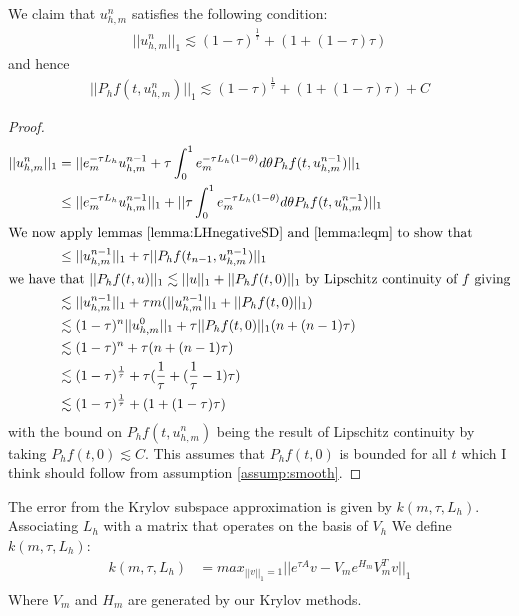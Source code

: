 \begin{lemma}
    We claim that $u_{h,m}^n$ satisfies the following condition:
    \begin{align*}
        ||u_{h,m}^n||_1 \lesssim (1-\tau)^\frac{1}{\tau} + (1 + (1 - \tau)\tau)
    \end{align*}
    and hence
    \begin{align*}
        ||P_hf(t,u_{h,m}^n)||_1 \lesssim (1-\tau)^\frac{1}{\tau} + (1 + (1 - \tau)\tau ) + C
    \end{align*}
\end{lemma}
\begin{proof}
    \begin{align*}
        ||u_{h,m}^n||_1 &= ||e_m^{-\tau L_h}u_{h,m}^{n-1} + \tau \int^1_0e_m^{-\tau L_h(1-\theta)}d\theta P_hf(t, u_{h,m}^{n-1})||_1\\
        &\leq ||e_m^{-\tau L_h}u_{h,m}^{n-1}||_1 + ||\tau \int^1_0e_m^{-\tau L_h(1-\theta)}d\theta P_hf(t, u_{h,m}^{n-1})||_1\\
        \intertext{We now apply lemmas \ref{lemma:LHnegativeSD} and \ref{lemma:leqm} to show that}
        &\leq ||u_{h,m}^{n-1}||_1 + \tau ||P_hf(t_{n-1},u_{h,m}^{n-1})||_1\\
        \intertext{we have that $||P_hf(t,u)||_1 \lesssim ||u||_1+||P_hf(t,0)||_1$ by Lipschitz continuity of $f$ giving}
        &\lesssim ||u_{h,m}^{n-1}||_1 + \tau m (||u_{h,m}^{n-1}||_1 + ||P_hf(t,0)||_1)\\
        &\lesssim (1-\tau)^n||u_{h,m}^0||_1 + \tau ||P_hf(t,0)||_1(n + (n -1)\tau)\\
        &\lesssim (1-\tau)^n + \tau (n + (n -1)\tau)\\
        &\lesssim (1-\tau)^\frac{1}{\tau} + \tau (\frac{1}{\tau} + (\frac{1}{\tau} -1)\tau)\\
        &\lesssim (1-\tau)^\frac{1}{\tau} + (1 + (1 - \tau)\tau)
    \end{align*}
    with the bound on $P_hf(t,u_{h,m}^n)$ being the result of Lipschitz continuity by taking $P_hf(t,0)\lesssim C$.
    This assumes that $P_hf(t,0)$ is bounded for all $t$ which I think should follow from assumption \ref{assump:smooth}.
\end{proof}
\begin{definition}
    The error from the Krylov subspace approximation is given by $k(m,\tau, L_h)$.
    Associating $L_h$ with a matrix that operates on the basis of $V_h$
    We define $k(m,\tau, L_h)$:
    \begin{align*}
        k(m,\tau, L_h) &= max_{||v||_1=1}||e^{\tau A}v - V_m e^{H_m}V^T_mv||_1\\
    \end{align*}
    Where $V_m$ and $H_m$ are generated by our Krylov methods.
\end{definition}
